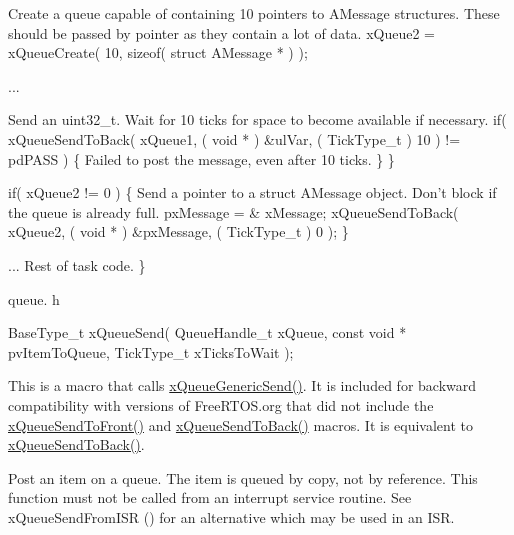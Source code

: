 \begin{DoxyPre}Create a queue capable of containing 10 pointers to AMessage structures.
These should be passed by pointer as they contain a lot of data.
    xQueue2 = xQueueCreate( 10, sizeof( struct AMessage * ) );\end{DoxyPre}



\begin{DoxyPre}...
\begin{DoxyVerb}if( xQueue1 != 0 )
{
\end{DoxyVerb}

Send an uint32\_t.  Wait for 10 ticks for space to become
available if necessary.
        if( xQueueSendToBack( xQueue1, ( void * ) \&ulVar, ( TickType\_t ) 10 ) != pdPASS )
        \{
Failed to post the message, even after 10 ticks.
        \}
    \}\end{DoxyPre}



\begin{DoxyPre}    if( xQueue2 != 0 )
    \{
Send a pointer to a struct AMessage object.  Don't block if the
queue is already full.
        pxMessage = \& xMessage;
        xQueueSendToBack( xQueue2, ( void * ) \&pxMessage, ( TickType\_t ) 0 );
    \}\end{DoxyPre}



\begin{DoxyPre}... Rest of task code.
 \}
 \end{DoxyPre}


queue. h 
\begin{DoxyPre}
 BaseType\_t xQueueSend(
                              QueueHandle\_t xQueue,
                              const void * pvItemToQueue,
                              TickType\_t xTicksToWait
                         );
   \end{DoxyPre}


This is a macro that calls \hyperlink{queue_8h_a7ce86d1026e0c3055a523935bf53c0b3}{x\-Queue\-Generic\-Send()}. It is included for backward compatibility with versions of Free\-R\-T\-O\-S.\-org that did not include the \hyperlink{queue_8h_aa612fcc2b1ceee0200f34b942e300b41}{x\-Queue\-Send\-To\-Front()} and \hyperlink{queue_8h_a81d24a2c1199d58efb76fbee15853112}{x\-Queue\-Send\-To\-Back()} macros. It is equivalent to \hyperlink{queue_8h_a81d24a2c1199d58efb76fbee15853112}{x\-Queue\-Send\-To\-Back()}.

Post an item on a queue. The item is queued by copy, not by reference. This function must not be called from an interrupt service routine. See x\-Queue\-Send\-From\-I\-S\-R () for an alternative which may be used in an I\-S\-R.


